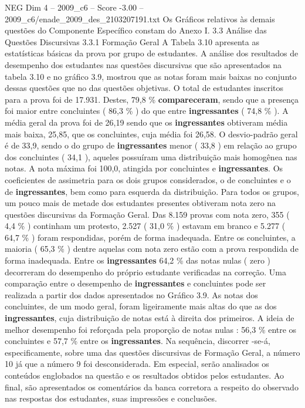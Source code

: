 \begin{textsample}{NEG Dim 4 – 2009\_c6 – Score -3.00 – 2009\_c6/enade\_2009\_des\_2103207191.txt}
Os Gráficos relativos às demais questões do Componente Específico constam do Anexo I. 3.3 Análise das Questões Discursivas 3.3.1 Formação Geral A Tabela 3.10 apresenta as estatísticas básicas da prova por grupo de estudantes.
A análise dos resultados de desempenho dos estudantes nas questões discursivas que são apresentados na tabela 3.10 e no gráfico 3.9, mostrou que as notas foram mais baixas no conjunto dessas questões que no das questões objetivas.
O total de estudantes inscritos para a prova foi de 17.931.
Destes, 79,8 \% \textbf{compareceram}, sendo que a presença foi maior entre concluintes ( 86,3 \% ) do que entre \textbf{ingressantes} ( 74,8 \% ).
A média geral da prova foi de 26,19 sendo que os \textbf{ingressantes} obtiveram média mais baixa, 25,85, que os concluintes, cuja média foi 26,58.
O desvio-padrão geral é de 33,9, sendo o do grupo de \textbf{ingressantes} menor ( 33,8 ) em relação ao grupo dos concluintes ( 34,1 ), aqueles possuíram uma distribuição mais homogênea nas notas.
A nota máxima foi 100,0, atingida por concluintes e \textbf{ingressantes}.
Os coeficientes de assimetria para os dois grupos considerados, o de concluintes e o de \textbf{ingressantes}, bem como para esquerda da distribuição.
Para todos os grupos, um pouco mais de metade dos estudantes presentes obtiveram nota zero na questões discursivas da Formação Geral.
Das 8.159 provas com nota zero, 355 ( 4,4 \% ) continham um protesto, 2.527 ( 31,0 \% ) estavam em branco e 5.277 ( 64,7 \% ) foram respondidas, porém de forma inadequada.
Entre os concluintes, a maioria ( 65,3 \% ) dentre aquelas com nota zero estão com a prova respondida de forma inadequada.
Entre os \textbf{ingressantes} 64,2 \% das notas nulas ( zero ) decorreram do desempenho do próprio estudante verificadas na correção.
Uma comparação entre o desempenho de \textbf{ingressantes} e concluintes pode ser realizada a partir dos dados apresentados no Gráfico 3.9.
As notas dos concluintes, de um modo geral, foram ligeiramente mais altas do que as dos \textbf{ingressantes}, cuja distribuição de notas está à direita dos primeiros.
A ideia de melhor desempenho foi reforçada pela proporção de notas nulas : 56,3 \% entre os concluintes e 57,7 \% entre os \textbf{ingressantes}.
Na sequência, discorrer -se-á, especificamente, sobre uma das questões discursivas de Formação Geral, a número 10 já que a número 9 foi desconsiderada.
Em especial, serão analisados os conteúdos englobados na questão e os resultados obtidos pelos estudantes.
Ao final, são apresentados os comentários da banca corretora a respeito do observado nas respostas dos estudantes, suas impressões e conclusões.

\end{textsample}
